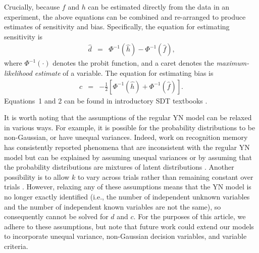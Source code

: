 \documentclass[man]{apa6}
\begin{document}
Crucially, because $f$ and $h$ can be estimated directly from the data in an experiment, the above equations can be combined and re-arranged to produce estimates of sensitivity and bias. Specifically, the equation for estimating sensitivity is
\begin{eqnarray}
\hat{d}&=&\Phi^{-1}\left(\hat{h}\right)-\Phi^{-1}\left(\hat{f}\right)\textrm{,}
\label{eq1}
\end{eqnarray}where $\Phi^{-1}\left(\cdot\right)$ denotes the probit function, and a caret denotes the \emph{maximum-likelihood estimate} of a variable. The equation for estimating bias is
\begin{eqnarray}
\hat{c}&=&-\frac{1}{2}\left[\Phi^{-1}\left(\hat{h}\right)+\Phi^{-1}\left(\hat{f}\right)\right]\textrm{.}
\label{eq2}
\end{eqnarray}
Equations~1 and 2 can be found in introductory SDT textbooks \parencite[e.g.,][]{Green1966, Macmillan2005}.

It is worth noting that the assumptions of the regular YN model can be relaxed in various ways. For example, it is possible for the probability distributions to be non-Gaussian, or have unequal variances. Indeed, work on recognition memory has consistently reported phenomena that are inconsistent with the regular YN model but can be explained by assuming unequal variances \parencite{Wixted2007, Yonelinas2007} or by assuming that the probability distributions are mixtures of latent distributions \parencite{decarlosignal2002}. Another possibility is to allow $k$ to vary across trials rather than remaining constant over trials \parencite[see][]{cabreraseparating2015}. However, relaxing any of these assumptions means that the YN model is no longer exactly identified (i.e., the number of independent unknown variables and the number of independent known variables are not the same), so consequently cannot be solved for $d$ and $c$. For the purposes of this article, we adhere to these assumptions, but note that future work could extend our models to incorporate unequal variance, non-Gaussian decision variables, and variable criteria.
\end{document}
